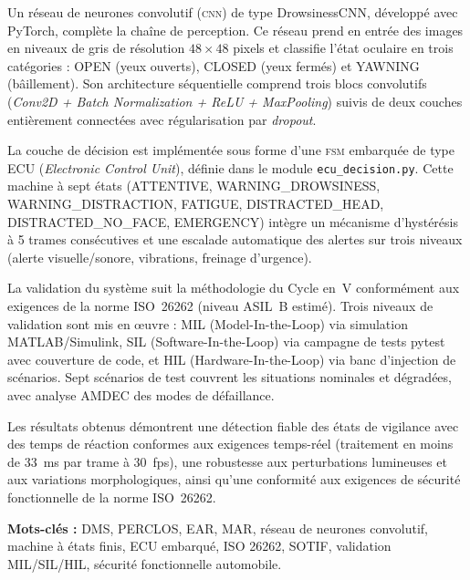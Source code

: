 \documentclass[12pt,a4paper]{report}
\begin{document}
Un r\'eseau de neurones convolutif (\textsc{cnn}) de type DrowsinessCNN, d\'evelopp\'e avec PyTorch, compl\`ete la cha\^ine de perception. Ce r\'eseau prend en entr\'ee des images en niveaux de gris de r\'esolution $48 \times 48$ pixels et classifie l'\'etat oculaire en trois cat\'egories : OPEN (yeux ouverts), CLOSED (yeux ferm\'es) et YAWNING (b\^aillement). Son architecture s\'equentielle comprend trois blocs convolutifs (\textit{Conv2D + Batch Normalization + ReLU + MaxPooling}) suivis de deux couches enti\`erement connect\'ees avec r\'egularisation par \textit{dropout}.

La couche de d\'ecision est impl\'ement\'ee sous forme d'une \textsc{fsm} embarqu\'ee de type ECU (\textit{Electronic Control Unit}), d\'efinie dans le module \texttt{ecu\_decision.py}. Cette machine \`a sept \'etats (ATTENTIVE, WARNING\_DROWSINESS, WARNING\_DISTRACTION, FATIGUE, DISTRACTED\_HEAD, DISTRACTED\_NO\_FACE, EMERGENCY) int\`egre un m\'ecanisme d'hyst\'er\'esis \`a 5 trames cons\'ecutives et une escalade automatique des alertes sur trois niveaux (alerte visuelle/sonore, vibrations, freinage d'urgence).

La validation du syst\`eme suit la m\'ethodologie du Cycle en~V conform\'ement aux exigences de la norme ISO~26262 (niveau ASIL~B estim\'e). Trois niveaux de validation sont mis en \oe uvre : MIL (Model-In-the-Loop) via simulation MATLAB/Simulink, SIL (Software-In-the-Loop) via campagne de tests pytest avec couverture de code, et HIL (Hardware-In-the-Loop) via banc d'injection de sc\'enarios. Sept sc\'enarios de test couvrent les situations nominales et d\'egrad\'ees, avec analyse AMDEC des modes de d\'efaillance.

Les r\'esultats obtenus d\'emontrent une d\'etection fiable des \'etats de vigilance avec des temps de r\'eaction conformes aux exigences temps-r\'eel (traitement en moins de 33~ms par trame \`a 30~fps), une robustesse aux perturbations lumineuses et aux variations morphologiques, ainsi qu'une conformit\'e aux exigences de s\'ecurit\'e fonctionnelle de la norme ISO~26262.

\vspace{0.5cm}
\noindent\textbf{Mots-cl\'es :} DMS, PERCLOS, EAR, MAR, r\'eseau de neurones convolutif, machine \`a \'etats finis, ECU embarqu\'e, ISO 26262, SOTIF, validation MIL/SIL/HIL, s\'ecurit\'e fonctionnelle automobile.

\clearpage

\end{document}
